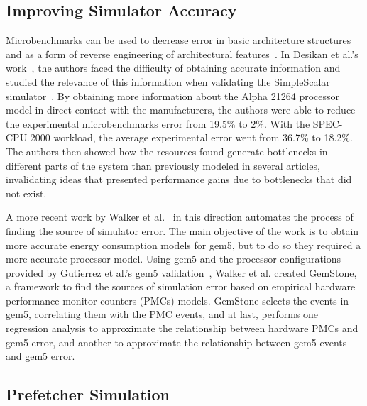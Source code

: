 \documentclass[AMA,final,STIX1COL]{WileyNJD-v2}
\begin{document}
\subsection{Improving Simulator Accuracy}

Microbenchmarks can be used to decrease error in basic architecture structures and as a form of reverse engineering of architectural features~\cite{fog2012microarchitecture}.
In Desikan et al.'s work~\cite{desikan2001measuring}, the authors faced the difficulty of obtaining accurate information and studied the relevance of this information when validating the SimpleScalar simulator~\cite{austin2002simplescalar}. 
By obtaining more information about the Alpha 21264 processor model in direct contact with the manufacturers, the authors were able to reduce the experimental microbenchmarks error from 19.5\% to 2\%.  
With the SPEC-CPU 2000 workload, the average experimental error went from 36.7\% to 18.2\%. 
The authors then showed how the resources found generate bottlenecks in different parts of the system than previously modeled in several articles, invalidating ideas that presented performance gains due to bottlenecks that did not exist.

A more recent work by Walker et al.~\cite{walker2018hardware} in this direction automates the process of finding the source of simulator error.
The main objective of the work is to obtain more accurate energy consumption models for gem5, but to do so they required a more accurate processor model. 
Using gem5 and the processor configurations provided by Gutierrez et al.'s gem5 validation~\cite{gutierrez2014sources}, Walker et al. created GemStone, a framework to find the sources of simulation error based on empirical hardware performance monitor counters (PMCs) models.
GemStone selects the events in gem5, correlating them with the PMC events, and at last, performs one regression analysis to approximate the relationship between hardware PMCs and gem5 error, and another to approximate the relationship between gem5 events and gem5 error.

\subsection{Prefetcher Simulation}
\end{document}
